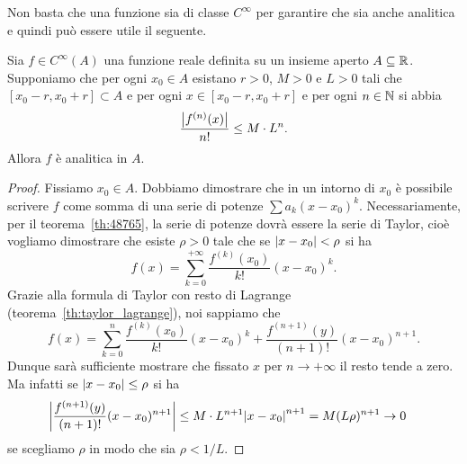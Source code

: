 Non basta che una funzione sia di classe $C^\infty$ per garantire
che sia anche analitica e quindi può essere utile il seguente.

\begin{theorem}
\label{th:criterio_analitica}
Sia $f\in C^\infty(A)$ una funzione reale definita su un
insieme aperto $A\subseteq {\mathbb R}$. Supponiamo che per ogni $x_0\in A$ esistano $r>0$,
$M>0$ e $L>0$ tali che $[x_0-r, x_0+r] \subset A$ e
per ogni $x\in [x_0-r, x_0+r]$ e per
ogni $n\in {\mathbb N}$ si abbia
\[
  \frac{{\left|f^{(n)}(x)\right|}}{n!} \le M\cdot L^n.
\]
Allora $f$ è analitica in $A$.
\end{theorem}
%
\begin{proof}
Fissiamo $x_0\in A$.
Dobbiamo dimostrare che in un intorno di $x_0$ è possibile
scrivere $f$ come somma di una serie di potenze $\sum a_k (x-x_0)^k$.
Necessariamente, per il teorema~\ref{th:48765}, la serie
di potenze dovrà essere la serie di Taylor, cioè vogliamo dimostrare che
esiste $\rho>0$ tale che se ${\left|x-x_0\right|}< \rho$ si ha
\[
  f(x) = \sum_{k=0}^{+\infty} \frac{f^{(k)}(x_0)}{k!}(x-x_0)^k.
\]
Grazie alla formula di Taylor con resto di Lagrange (teorema~\ref{th:taylor_lagrange}),
noi sappiamo che
\[
  f(x) = \sum_{k=0}^{n} \frac{f^{(k)}(x_0)}{k!}(x-x_0)^k
   + \frac{f^{(n+1)}(y)}{(n+1)!}(x-x_0)^{n+1}.
\]
Dunque sarà sufficiente mostrare che fissato $x$ per $n\to +\infty$ il resto
tende a zero.
Ma infatti se ${\left|x-x_0\right|}\le \rho$ si ha
\begin{align*}
 {\left|\frac{f^{(n+1)}(y)}{(n+1)!}(x-x_0)^{n+1}\right|}
 & \le  M\cdot L^{n+1}{\left|x-x_0\right|}^{n+1}
 = M (L\rho)^{n+1}\to 0
\end{align*}
se scegliamo $\rho$ in modo che sia $\rho < 1/L$.
\end{proof}


